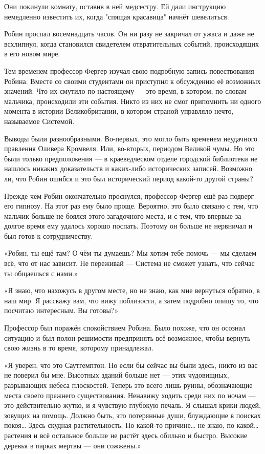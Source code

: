 \documentclass[a5paper, 9pt,
final, openany, twoside=true]{memoir}
\begin{document}
Они покинули комнату, оставив в ней медсестру. Ей дали инструкцию немедленно известить их, когда "спящая красавица" начнёт шевелиться.

Робин проспал восемнадцать часов. Он ни разу не закричал от ужаса и даже не всхлипнул, когда становился свидетелем отвратительных событий, происходящих в его новом мире.\bigskip

Тем временем профессор Фергер изучал свою подробную запись повествования Робина. Вместе со своими студентами он приступил к обсуждению её возможных значений. Что их смутило по-настоящему — это время, в котором, по словам мальчика, происходили эти события. Никто из них не смог припомнить ни одного момента в истории Великобритании, в котором страной управляло нечто, называемое Системой.

Выводы были разнообразными. Во-первых, это могло быть временем неудачного правления Оливера Кромвеля. Или, во-вторых, периодом Великой чумы. Но это были только предположения — в краеведческом отделе городской библиотеки не нашлось никаких доказательств и каких-либо исторических записей. Возможно ли, что Робин ошибся и это был исторический период какой-то другой страны?\bigskip

Прежде чем Робин окончательно проснулся, профессор Фергер ещё раз подверг его гипнозу. На этот раз ему было проще. Вероятно, это было связано с тем, что мальчик больше не боялся этого загадочного места, и с тем, что впервые за долгое время ему удалось хорошо поспать. Поэтому он больше не нервничал и был готов к сотрудничеству.

«Робин, ты ещё там? О чём ты думаешь? Мы хотим тебе помочь — мы сделаем всё, что от нас зависит. Не переживай — Система не сможет узнать, что сейчас ты общаешься с нами.»

«Я знаю, что нахожусь в другом месте, но не знаю, как мне вернуться обратно, в наш мир. Я расскажу вам, что вижу поблизости, а затем подробно опишу то, что посчитаю интересным. Вы готовы?»

Профессор был поражён спокойствием Робина. Было похоже, что он осознал ситуацию и был полон решимости предпринять всё возможное, чтобы вернуть свою жизнь в то время, которому принадлежал.

«Я уверен, что это Саутгемптон. Но если бы сейчас вы были здесь, никто из вас не поверил бы мне. Высотных зданий больше нет — этих чудовищных, разрывающих небеса плоскостей. Теперь это всего лишь руины, обозначающие места своего прежнего существования. Ненавижу ходить среди них по ночам — это действительно жутко, и я чувствую глубокую печаль. Я слышал крики людей, зовущих на помощь. Должно быть, это потерянные души, блуждающие в поисках покоя… Здесь скудная растительность. По какой-то причине…  не знаю, по какой… растения и всё остальное больше не растёт здесь обильно и быстро. Высокие деревья в парках мертвы — они сожжены.»
\end{document}
